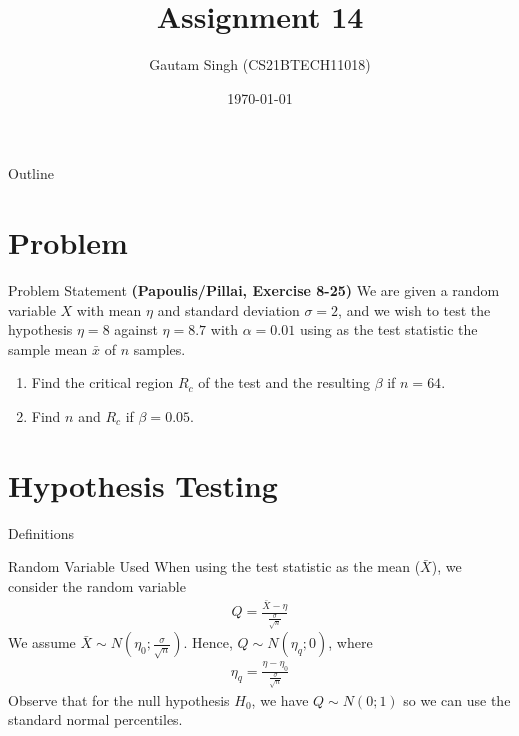 \documentclass{beamer}
\title{Assignment 14}
\author{Gautam Singh (CS21BTECH11018)}
\date{\today}
\begin{document}
\begin{frame}
    \titlepage 
\end{frame}

\begin{frame}{Outline}
    \tableofcontents
\end{frame}

\section{Problem}
\begin{frame}{Problem Statement}
	\textbf{(Papoulis/Pillai, Exercise 8-25)} We are given a random variable $X$ with mean $\eta$ and standard deviation $\sigma = 2$, and we wish to test the hypothesis $\eta = 8$ against $\eta = 8.7$ with $\alpha = 0.01$ using as the test statistic the sample mean $\bar{x}$ of $n$ samples.
	\begin{enumerate}
		\item Find the critical region $R_c$ of the test and the resulting $\beta$ if $n = 64$. 
		\item Find $n$ and $R_c$ if $\beta = 0.05$.
	\end{enumerate}
\end{frame}

\section{Hypothesis Testing}
\begin{frame}{Definitions}
	\begin{alertblock}{Random Variable Used}
		When using the test statistic as the mean ($\bar{X}$), we consider the random variable
		\begin{align}
			Q = \frac{\bar{X} - \eta}{\frac{\sigma}{\sqrt{n}}}
			\label{eq:Q}
		\end{align}
		We assume $\bar{X} \sim N(\eta_0 ; \frac{\sigma}{\sqrt{n}})$. Hence, $Q \sim N(\eta_q ; 0)$, where
		\begin{align}
			\eta_q = \frac{\eta - \eta_0}{\frac{\sigma}{\sqrt{n}}}
			\label{eq:eta-q}
		\end{align}
		Observe that for the null hypothesis $H_0$, we have $Q \sim N(0; 1)$ so we can use the standard normal percentiles.
	\end{alertblock}
\end{frame}
\end{document}
